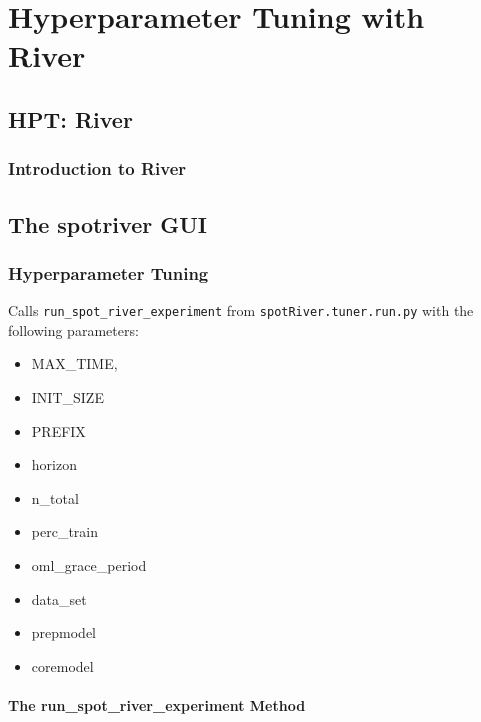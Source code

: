 \documentclass[
  letterpaper,
  DIV=11,
  numbers=noendperiod]{scrreprt}
\providecommand{\tightlist}{%
  \setlength{\itemsep}{0pt}\setlength{\parskip}{0pt}}\usepackage{longtable,booktabs,array}
\begin{document}
\part{Hyperparameter Tuning with River}

\hypertarget{sec-hpt-river}{%
\chapter{HPT: River}\label{sec-hpt-river}}

\hypertarget{sec-hpt-river-intro}{%
\section{Introduction to River}\label{sec-hpt-river-intro}}

\hypertarget{the-spotriver-gui}{%
\chapter{The spotriver GUI}\label{the-spotriver-gui}}

\hypertarget{hyperparameter-tuning-1}{%
\section{Hyperparameter Tuning}\label{hyperparameter-tuning-1}}

Calls \texttt{run\_spot\_river\_experiment} from
\texttt{spotRiver.tuner.run.py} with the following parameters:

\begin{itemize}
\tightlist
\item
  MAX\_TIME,
\item
  INIT\_SIZE
\item
  PREFIX
\item
  horizon
\item
  n\_total
\item
  perc\_train
\item
  oml\_grace\_period
\item
  data\_set
\item
  prepmodel
\item
  coremodel
\end{itemize}

\hypertarget{the-run_spot_river_experiment-method}{%
\subsection{The run\_spot\_river\_experiment
Method}\label{the-run_spot_river_experiment-method}}
\end{document}
